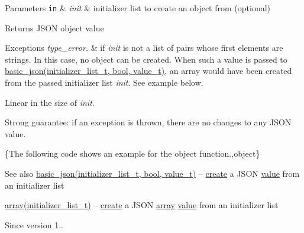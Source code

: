 \begin{DoxyParams}[1]{Parameters}
\mbox{\tt in}  & {\em init} & initializer list to create an object from (optional)\\
\hline
\end{DoxyParams}
\begin{DoxyReturn}{Returns}
J\+S\+ON object value
\end{DoxyReturn}

\begin{DoxyExceptions}{Exceptions}
{\em type\+\_\+error.} & if {\itshape init} is not a list of pairs whose first elements are strings. In this case, no object can be created. When such a value is passed to \hyperlink{classnlohmann_1_1basic__json_ab5dfd9a2b2663b219641cb7fe59b6da2}{basic\+\_\+json(initializer\+\_\+list\+\_\+t, bool, value\+\_\+t)}, an array would have been created from the passed initializer list {\itshape init}. See example below.\\
\hline
\end{DoxyExceptions}
Linear in the size of {\itshape init}.

Strong guarantee\+: if an exception is thrown, there are no changes to any J\+S\+ON value.

\{The following code shows an example for the {\ttfamily object} function.,object\}

\begin{DoxySeeAlso}{See also}
\hyperlink{classnlohmann_1_1basic__json_ab5dfd9a2b2663b219641cb7fe59b6da2}{basic\+\_\+json(initializer\+\_\+list\+\_\+t, bool, value\+\_\+t)} -- \hyperlink{classnlohmann_1_1basic__json_a39c5d800f9ceb5912648ddce4e9326ce}{create} a J\+S\+ON \hyperlink{classnlohmann_1_1basic__json_a404017aa52714a0a4bc79d5af7e4ad2b}{value} from an initializer list 

\hyperlink{classnlohmann_1_1basic__json_a8a7d537fc297bbc5b845f92fe0445e3b}{array(initializer\+\_\+list\+\_\+t)} -- \hyperlink{classnlohmann_1_1basic__json_a39c5d800f9ceb5912648ddce4e9326ce}{create} a J\+S\+ON \hyperlink{classnlohmann_1_1basic__json_a8a7d537fc297bbc5b845f92fe0445e3b}{array} \hyperlink{classnlohmann_1_1basic__json_a404017aa52714a0a4bc79d5af7e4ad2b}{value} from an initializer list
\end{DoxySeeAlso}
\begin{DoxySince}{Since}
version 1.. 
\end{DoxySince}
